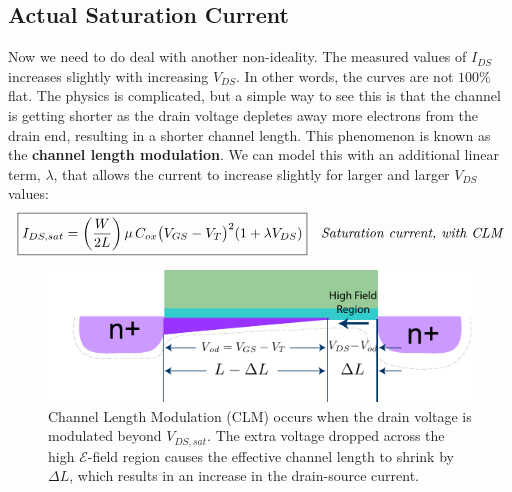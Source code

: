 \subsection{Actual Saturation Current}
Now we need to do deal with another non-ideality.  The measured values of $I_{DS}$ increases slightly with increasing $V_{DS}$.  In other words, the curves are not $100\%$ flat.  The physics is complicated, but a simple way to see this is that the channel is getting shorter as the drain voltage depletes away more electrons from the drain end, resulting in a shorter channel length.  This phenomenon is known as the \textbf{channel length modulation}.  We can model this with an additional linear term, $\lambda$, that allows the current to increase slightly for larger and larger $V_{DS}$ values:
    \begin{align}
        \Aboxed{I_{DS,sat} = \left(\frac{W}{2L}\right)\mu\,C_{ox}{\big(V_{GS} - V_T\big)}^2(1 + \lambda V_{DS})}
        &\textit{Saturation current, with CLM}
        \label{eq:drain_current_clm}
    \end{align}
\newpage
\begin{figure}[t]
\centering
\includegraphics[width=\columnwidth]{mos_current_sat_clm}
\caption{Channel Length Modulation (CLM) occurs when the drain voltage is modulated beyond $V_{DS,sat}$.  The extra voltage dropped across the high $\mathcal{E}$-field region causes the effective channel length to shrink by $\Delta L$, which results in an increase in the drain-source current.}
\label{fig:mos_current_sat_clm}
\end{figure}
